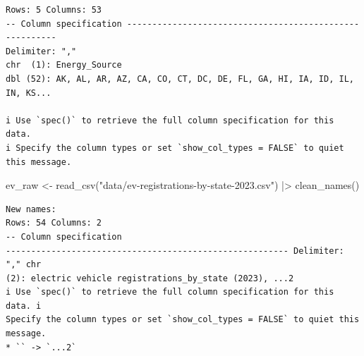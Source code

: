 \documentclass[
  letterpaper,
  DIV=11,
  numbers=noendperiod]{scrartcl}
\newenvironment{Shaded}{\begin{snugshade}}{\end{snugshade}}
\newcommand{\FunctionTok}[1]{\textcolor[rgb]{0.28,0.35,0.67}{#1}}
\newcommand{\NormalTok}[1]{\textcolor[rgb]{0.00,0.23,0.31}{#1}}
\newcommand{\OtherTok}[1]{\textcolor[rgb]{0.00,0.23,0.31}{#1}}
\newcommand{\SpecialCharTok}[1]{\textcolor[rgb]{0.37,0.37,0.37}{#1}}
\newcommand{\StringTok}[1]{\textcolor[rgb]{0.13,0.47,0.30}{#1}}
\begin{document}
\begin{verbatim}
Rows: 5 Columns: 53
-- Column specification --------------------------------------------------------
Delimiter: ","
chr  (1): Energy_Source
dbl (52): AK, AL, AR, AZ, CA, CO, CT, DC, DE, FL, GA, HI, IA, ID, IL, IN, KS...

i Use `spec()` to retrieve the full column specification for this data.
i Specify the column types or set `show_col_types = FALSE` to quiet this message.
\end{verbatim}

\begin{Shaded}
\begin{Highlighting}[]
\NormalTok{ev\_raw     }\OtherTok{\textless{}{-}} \FunctionTok{read\_csv}\NormalTok{(}\StringTok{"data/ev{-}registrations{-}by{-}state{-}2023.csv"}\NormalTok{) }\SpecialCharTok{|\textgreater{}} \FunctionTok{clean\_names}\NormalTok{()}
\end{Highlighting}
\end{Shaded}

\begin{verbatim}
New names:
Rows: 54 Columns: 2
-- Column specification
-------------------------------------------------------- Delimiter: "," chr
(2): electric vehicle registrations_by_state (2023), ...2
i Use `spec()` to retrieve the full column specification for this data. i
Specify the column types or set `show_col_types = FALSE` to quiet this message.
* `` -> `...2`
\end{verbatim}
\end{document}
